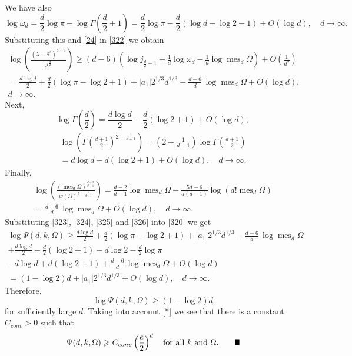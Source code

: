 \documentclass[a4paper,12pt]{article}
\numberwithin{equation}{section}
\def \de{\delta}
\def \la{\lambda}
\def \oo{\omega}
\def \G{\Gamma}
\def \O{\Omega}
\def\mes{\operatorname{mes}}
\newcommand{\<}{\langle}
\renewcommand{\>}{\rangle}
\theoremstyle{plain}
\theoremstyle{definition}
\theoremstyle{remark}
\renewcommand{\ge}{\geqslant}
\renewcommand{\qed}{\vrule height7pt width5pt depth0pt}
\begin{document}
We have also
$$
\log \oo_d = \frac{d}2 \log \pi - \log \G \left(\frac{d}2 + 1\right)
= \frac{d}2 \log \pi - \frac{d}2 \left(\log d - \log 2 - 1\right) + O (\log d), \quad d\to \infty.
$$
Substituting this and \eqref{24} in \eqref{322} we obtain
\begin{eqnarray}
\nonumber
\log \left(\frac{(\la-\de^2)^{d-3}}{\la^{\frac{d}2}}\right) 
\ge (d-6) \left(\log j_{\frac{d}2-1} + \frac1d \log \oo_d - \frac1d \log \mes_d \O\right)
+ O \left(\frac1{d^2}\right) \\
\label{323}
= \frac{d \log d}2 + \frac{d}2 \left(\log \pi - \log 2 +1\right)
+ |a_1| 2^{1/3} d^{1/3} - \frac{d-6}d \, \log \mes_d \O + O (\log d), \\
d\to \infty.
\nonumber
\end{eqnarray}
Next,
\begin{equation}
\label{324}
\log \G \left(\frac{d}2\right) 
= \frac{d \log d}2 - \frac{d}2 \left(\log 2 +1\right) + O (\log d), 
\end{equation}
\begin{eqnarray}
\nonumber
\log\left(\G \left(\frac{d+1}2\right)^{2 - \frac1{d-1}}\right)
= \left(2 - \frac1{d-1}\right) \log \G \left(\frac{d+1}2\right) \\
\label{325}
= d \log d - d \left(\log 2 + 1\right) + O (\log d), \quad d \to \infty.
\end{eqnarray}
Finally, 
\begin{eqnarray}
\nonumber
\log \left(\frac{(\mes_d \O)^{\frac{d-2}{d-1}}}{w(\O)^{5 - \frac1{d-1}}}\right)
= \frac{d-2}{d-1} \log \mes_d \O 
- \frac{5d-6}{d(d-1)} \log \left(d! \mes_d \O\right) \\
= \frac{d-6}d \, \log \mes_d \O + O (\log d), \quad d \to \infty.
\label{326}
\end{eqnarray}
Substituting \eqref{323}, \eqref{324}, \eqref{325} and \eqref{326} into \eqref{320} we get
\begin{eqnarray*}
\log \Psi (d, k, \O) 
\ge  \frac{d \log d}2 + \frac{d}2 \left(\log \pi - \log 2 +1\right)
+ |a_1| 2^{1/3} d^{1/3} - \frac{d-6}d \, \log \mes_d \O \\
+ \frac{d \log d}2 - \frac{d}2 \left(\log 2 +1\right) 
- d \log 2 - \frac{d}2 \log \pi \\
- d \log d + d \left(\log 2 + 1\right) 
+ \frac{d-6}d \, \log \mes_d \O + O (\log d) \\
= \left(1 - \log 2\right) d + |a_1| 2^{1/3} d^{1/3} + O (\log d), \quad d \to \infty.
\end{eqnarray*}
Therefore,
$$
\log \Psi (d, k, \O) \ge \left(1 - \log 2\right) d
$$
for sufficiently large $d$.
Taking into account \eqref{*} we see that there is a constant $C_{conv} > 0$ such that
$$
\Psi (d,k,\O) \ge C_{conv} \left(\frac{e}2\right)^d \quad \text{for all}\ k\ \text{and}\ \O.
\qquad \qed
$$
\end{document}
